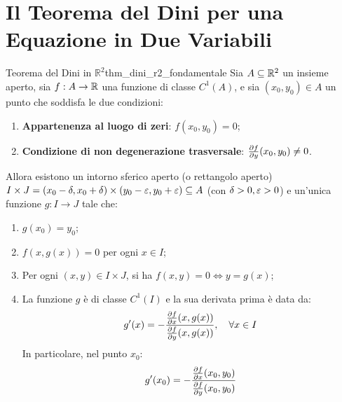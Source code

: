 \section{Il Teorema del Dini per una Equazione in Due Variabili}

\begin{teorema}{Teorema del Dini in $\mathbb{R}^2$}{thm_dini_r2_fondamentale}
Sia $A \subseteq \mathbb{R}^2$ un insieme aperto, sia $f: A \to \mathbb{R}$ una funzione di classe $C^1(A)$, e sia $(x_0, y_0) \in A$ un punto che soddisfa le due condizioni:
\begin{enumerate}
    \item \textbf{Appartenenza al luogo di zeri}: $f(x_0, y_0) = 0$;
    \item \textbf{Condizione di non degenerazione trasversale}: $\frac{\partial f}{\partial y}(x_0, y_0) \neq 0$.
\end{enumerate}
Allora esistono un intorno sferico aperto (o rettangolo aperto) $I \times J = (x_0 - \delta, x_0 + \delta) \times (y_0 - \varepsilon, y_0 + \varepsilon) \subseteq A$ (con $\delta > 0, \varepsilon > 0$) e un'unica funzione $g: I \to J$ tale che:
\begin{enumerate}[label=(\alph*)]
    \item $g(x_0) = y_0$;
    \item $f(x, g(x)) = 0$ per ogni $x \in I$;
    \item Per ogni $(x, y) \in I \times J$, si ha $f(x, y) = 0 \iff y = g(x)$;
    \item La funzione $g$ è di classe $C^1(I)$ e la sua derivata prima è data da:
    \[
    g'(x) = -\frac{\frac{\partial f}{\partial x}(x, g(x))}{\frac{\partial f}{\partial y}(x, g(x))}, \quad \forall x \in I
    \]
    In particolare, nel punto $x_0$:
    \[
    g'(x_0) = -\frac{\frac{\partial f}{\partial x}(x_0, y_0)}{\frac{\partial f}{\partial y}(x_0, y_0)}
    \]
\end{enumerate}
\end{teorema}

